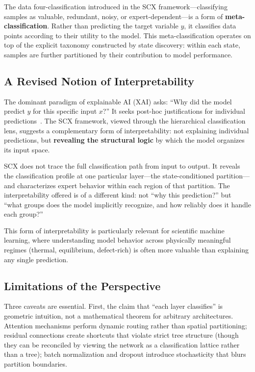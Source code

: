\documentclass[twocolumn]{article}
\theoremstyle{definition}
\begin{document}
The data four-classification introduced in the SCX framework---classifying samples as valuable, redundant, noisy, or expert-dependent---is a form of \textbf{meta-classification}. Rather than predicting the target variable $y$, it classifies data points according to their utility to the model. This meta-classification operates on top of the explicit taxonomy constructed by state discovery: within each state, samples are further partitioned by their contribution to model performance.

\subsection{A Revised Notion of Interpretability}

The dominant paradigm of explainable AI (XAI) asks: ``Why did the model predict $y$ for this specific input $x$?'' It seeks post-hoc justifications for individual predictions~\cite{lundberg2017shap,ribeiro2016lime}. The SCX framework, viewed through the hierarchical classification lens, suggests a complementary form of interpretability: not explaining individual predictions, but \textbf{revealing the structural logic} by which the model organizes its input space.

SCX does not trace the full classification path from input to output. It reveals the classification profile at one particular layer---the state-conditioned partition---and characterizes expert behavior within each region of that partition. The interpretability offered is of a different kind: not ``why this prediction?'' but ``what groups does the model implicitly recognize, and how reliably does it handle each group?''

This form of interpretability is particularly relevant for scientific machine learning, where understanding model behavior across physically meaningful regimes (thermal, equilibrium, defect-rich) is often more valuable than explaining any single prediction.

\subsection{Limitations of the Perspective}

Three caveats are essential. First, the claim that ``each layer classifies'' is geometric intuition, not a mathematical theorem for arbitrary architectures. Attention mechanisms perform dynamic routing rather than spatial partitioning; residual connections create shortcuts that violate strict tree structure (though they can be reconciled by viewing the network as a classification lattice rather than a tree); batch normalization and dropout introduce stochasticity that blurs partition boundaries.
\end{document}

